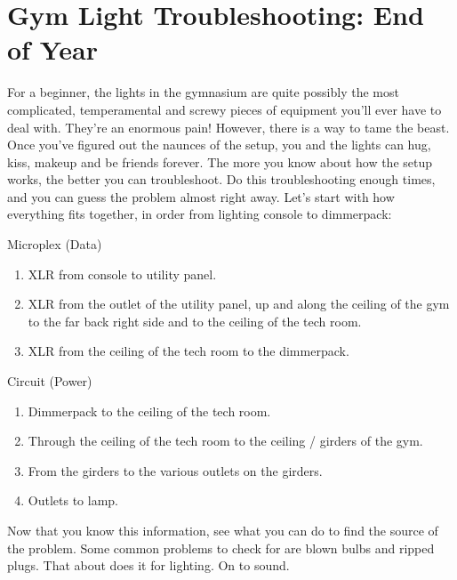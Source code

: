 \documentclass[11pt,a4paper]{book}
\begin{document}
\section{Gym Light Troubleshooting: End of Year}
For a beginner, the lights in the gymnasium are quite possibly the most complicated, temperamental and screwy pieces of equipment you'll ever have to deal with. They're an enormous pain! However, there is a way to tame the beast. Once you've figured out the naunces of the setup, you and the lights can hug, kiss, makeup and be friends forever. The more you know about how the setup works, the better you can troubleshoot. Do this troubleshooting enough times, and you can guess the problem almost right away. Let's start with how everything fits together, in order from lighting console to dimmerpack:
\begin{center}
Microplex (Data)
\end{center}
\begin{enumerate}
\item XLR from console to utility panel.
\item XLR from the outlet of the utility panel, up and along the ceiling of the gym to the far back right side and to the ceiling of the tech room.
\item XLR from the ceiling of the tech room to the dimmerpack.
\end{enumerate}

\pagebreak 
\begin{center}
Circuit (Power)
\end{center}
\begin{enumerate}
\item Dimmerpack to the ceiling of the tech room.
\item Through the ceiling of the tech room to the ceiling / girders of the gym.
\item From the girders to the various outlets on the girders.
\item Outlets to lamp.
\end{enumerate}

Now that you know this information, see what you can do to find the source of the problem. Some common problems to check for are blown bulbs and ripped plugs. That about does it for lighting. On to sound.
\end{document}
